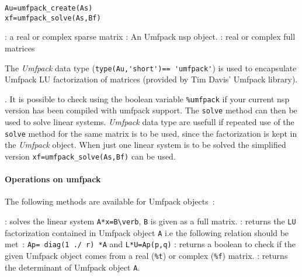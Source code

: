 
\begin{mandesc}
\end{mandesc}

\begin{calling_sequence}
\begin{verbatim}
Au=umfpack_create(As)
xf=umfpack_solve(As,Bf)
\end{verbatim}
\end{calling_sequence}
\begin{parameters}
  \begin{varlist}
    : a real or complex sparse matrix
    : An Umfpack nsp object.
    : real or complex full matrices 
  \end{varlist}
\end{parameters}

\begin{mandescription}
The \emph{Umfpack} data type (\verb+type(Au,'short')== 'umfpack'+) is used to 
encapsulate Umfpack LU factorization of matrices (provided by Tim Davis' Umfpack library). 
\end{mandescription}. It is possible to check using the boolean variable \verb+%umfpack+ 
if your current nsp version has been compiled with umfpack support. The \verb+solve+ method 
can then be used to solve linear systems. \emph{Umfpack} data type are usefull if 
repeated use of the \verb+solve+ method for the same matrix is to be used, 
since the factorization is kept in the \emph{Umfpack} object. When just one linear 
system is to be solved the simplified version \verb+xf=umfpack_solve(As,Bf)+ can be used. 

\paragraph{Operations on umfpack}
The following methods are available for Umfpack objects~:
\begin{varlist}
  : solves the linear system \verb+A*x=B\verb+, \verb+B+ is given as a full 
   matrix. 
  : returns the \verb+LU+ factorization contained in Umfpack object \verb+A+ i.e the following relation should be met~: \verb+Ap= diag(1 ./ r) *A+ and 
  \verb+L*U=Ap(p,q)+ 
  : returns a boolean to check if the given Umfpack object comes from a real 
(\verb+%t+) or complex (\verb+%f+) matrix. 
: returns the determinant of Umfpack object \verb+A+.
  \end{varlist}

